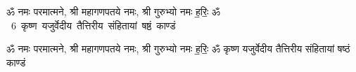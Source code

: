 \documentclass[17pt]{extarticle}
\begin{document}
\begin{titlepage}
    \begin{center}
 
\begin{sanskrit}
    { \Large
    ॐ नमः परमात्मने, श्री महागणपतये नमः, श्री गुरुभ्यो नमः
ह॒रिः॒ ॐ 
    }
    \\
    \vspace{2.5cm}
    \mbox{ \Huge
    6       कृष्ण यजुर्वेदीय तैत्तिरीय संहितायां षष्ठं काण्डं    }
\end{sanskrit}
\end{center}

\end{titlepage}
\tableofcontents

ॐ नमः परमात्मने, श्री महागणपतये नमः, श्री गुरुभ्यो नमः
ह॒रिः॒ ॐ        कृष्ण यजुर्वेदीय तैत्तिरीय संहितायां षष्ठं काण्डं  \newline
\end{document}
